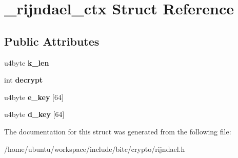 \hypertarget{struct__rijndael__ctx}{\section{\-\_\-rijndael\-\_\-ctx Struct Reference}
\label{struct__rijndael__ctx}
}
\subsection*{Public Attributes}
\begin{DoxyCompactItemize}
\item 
\hypertarget{struct__rijndael__ctx_ac3595b891818be236ee4cbf50995b8af}{u4byte {\bfseries k\-\_\-len}}\label{struct__rijndael__ctx_ac3595b891818be236ee4cbf50995b8af}

\item 
\hypertarget{struct__rijndael__ctx_aa07afd8353126ce5e938b42ceaff42b7}{int {\bfseries decrypt}}\label{struct__rijndael__ctx_aa07afd8353126ce5e938b42ceaff42b7}

\item 
\hypertarget{struct__rijndael__ctx_abc54a82997fe467b97400f22d9b4d7dc}{u4byte {\bfseries e\-\_\-key} \mbox{[}64\mbox{]}}\label{struct__rijndael__ctx_abc54a82997fe467b97400f22d9b4d7dc}

\item 
\hypertarget{struct__rijndael__ctx_a45e6be46127c0bb68886cd4c0c725dc6}{u4byte {\bfseries d\-\_\-key} \mbox{[}64\mbox{]}}\label{struct__rijndael__ctx_a45e6be46127c0bb68886cd4c0c725dc6}

\end{DoxyCompactItemize}


The documentation for this struct was generated from the following file\-:\begin{DoxyCompactItemize}
\item 
/home/ubuntu/workspace/include/bitc/crypto/rijndael.\-h\end{DoxyCompactItemize}

